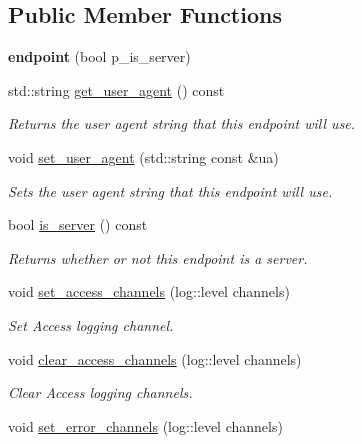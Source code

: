 \subsection*{Public Member Functions}
\begin{DoxyCompactItemize}
\item 
{\bfseries endpoint} (bool p\+\_\+is\+\_\+server)\hypertarget{classwebsocketpp_1_1endpoint_a12015b0910fe39d0cbbd7fc7ea5ffcfd}{}\label{classwebsocketpp_1_1endpoint_a12015b0910fe39d0cbbd7fc7ea5ffcfd}

\item 
std\+::string \hyperlink{classwebsocketpp_1_1endpoint_a2a106056b019063573120c7a61472834}{get\+\_\+user\+\_\+agent} () const
\begin{DoxyCompactList}\small\item\em Returns the user agent string that this endpoint will use. \end{DoxyCompactList}\item 
void \hyperlink{classwebsocketpp_1_1endpoint_a06a703c52196d900d1e58b79d6657cc8}{set\+\_\+user\+\_\+agent} (std\+::string const \&ua)
\begin{DoxyCompactList}\small\item\em Sets the user agent string that this endpoint will use. \end{DoxyCompactList}\item 
bool \hyperlink{classwebsocketpp_1_1endpoint_a4f6a1e239250ef6c485865e2adf65b1b}{is\+\_\+server} () const
\begin{DoxyCompactList}\small\item\em Returns whether or not this endpoint is a server. \end{DoxyCompactList}\item 
void \hyperlink{classwebsocketpp_1_1endpoint_a5d7da609ebd2f797e5e67b6d050ebc59}{set\+\_\+access\+\_\+channels} (log\+::level channels)
\begin{DoxyCompactList}\small\item\em Set Access logging channel. \end{DoxyCompactList}\item 
void \hyperlink{classwebsocketpp_1_1endpoint_a3fe357b3c6434273a9965eb52902575d}{clear\+\_\+access\+\_\+channels} (log\+::level channels)
\begin{DoxyCompactList}\small\item\em Clear Access logging channels. \end{DoxyCompactList}\item 
void \hyperlink{classwebsocketpp_1_1endpoint_a8292bcdca9344b57af1b0964ff7fc778}{set\+\_\+error\+\_\+channels} (log\+::level channels)

\end{DoxyCompactItemize}
